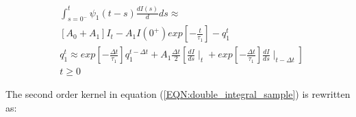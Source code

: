 \begin{equation}
\begin{aligned}
& \int_{s=0^{-}}^{t}  \psi_1(t-s) \frac{dI(s)}{d}ds \approx \\
& \left[ A_0+A_1 \right] I_t -A_1 I(0^+) exp \left[- \frac{t}{\tau_1} \right] -q^t_1\\
& q^t_1 \approx exp \left[- \frac{\Delta t}{\tau_1} \right] q^{t-\Delta t}_1 +A_1 \frac{\Delta t}{2} 
\left[ \frac{dI}{ds} \mid_t + exp \left[ - \frac{\Delta t}{\tau_1} \right]  \frac{dI}{ds} \mid_{t-\Delta t} \right]  \\
& t \geq 0 
\end{aligned}
\label{EQN_2.23:double_integral_expand}
\end{equation}

The second order kernel in equation (\ref{EQN:double_integral_sample}) is rewritten as:


